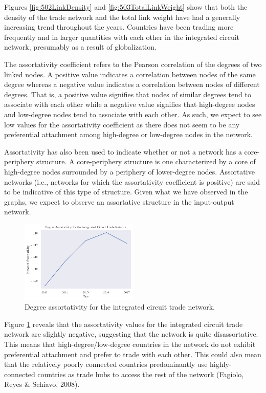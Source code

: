 \documentclass[12pt,letterpaper]{report}
\begin{document}
		Figures \ref{fig:502LinkDensity} and \ref{fig:503TotalLinkWeight} show that both the density of the trade network and the total link weight have had a generally increasing trend throughout the years. Countries have been trading more frequently and in larger quantities with each other in the integrated circuit network, presumably as a result of globalization.
		
		The assortativity coefficient refers to the Pearson correlation of the degrees of two linked nodes. A positive value indicates a correlation between nodes of the same degree whereas a negative value indicates a correlation between nodes of different degrees. That is, a positive value signifies that nodes of similar degrees tend to associate with each other while a negative value signifies that high-degree nodes and low-degree nodes tend to associate with each other. As such, we expect to see low values for the assortativity coefficient as there does not seem to be any preferential attachment among high-degree or low-degree nodes in the network.
		
		Assortativity has also been used to indicate whether or not a network has a core-periphery structure. A core-periphery structure is one characterized by a core of high-degree nodes surrounded by a periphery of lower-degree nodes. Assortative networks (i.e., networks for which the assortativity coefficient is positive) are said to be indicative of this type of structure. Given what we have observed in the graphs, we expect to observe an assortative structure in the input-output network.
		
		\begin{figure}[!h]
			\centering
			\includegraphics[width=0.5\textwidth]{Fig504-Assortativity.png}
			\caption{Degree assortativity for the integrated circuit trade network.}\label{fig:504Assortativity}
		\end{figure}
	
		Figure \ref{fig:504Assortativity} reveals that the assortativity values for the integrated circuit trade network are slightly negative, suggesting that the network is quite disassortative. This means that high-degree/low-degree countries in the network do not exhibit preferential attachment and prefer to trade with each other. This could also mean that the relatively poorly connected countries predominantly use highly-connected countries as trade hubs to access the rest of the network (Fagiolo, Reyes \& Schiavo, 2008). 
		
\end{document}
